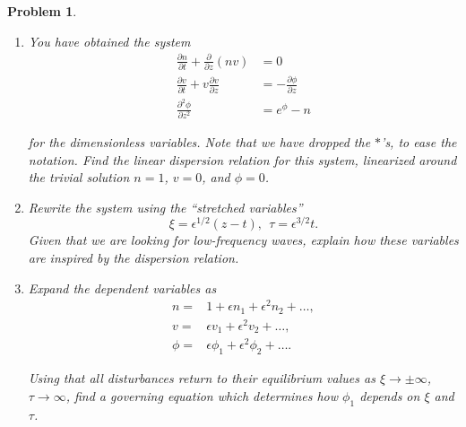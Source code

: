 \documentclass[12pt]{report}
\newtheorem{problem}{Problem}
\def\eps{{\epsilon}}
\newcommand{\pp}[2]{\frac{\partial #1}{\partial #2}} %
\newcommand{\ppn}[3]{\frac{\partial^{#1} #2}{\partial #3^{#1}}} %
\begin{document}
\begin{problem}
\begin{enumerate}
\item[{\bf c}] You have obtained the system
\begin{align*}
    \pp{n}{t}+\pp{}{z}(nv)&=0\\
    \pp{v}{t}+v\pp{v}{z}&= -\pp{\phi}{z}\\
    \ppn{2}{\phi}{z}&= e^\phi-n    
\end{align*}

for the dimensionless variables. Note that we have dropped the $*$'s,
to ease the notation. Find the linear dispersion relation for this
system, linearized around the trivial solution $n=1$, $v=0$, and
$\phi=0$.

\item[{\bf d}] Rewrite the system using the ``stretched variables''
\[
\xi=\eps^{1/2}(z-t), ~~\tau=\eps^{3/2} t.
\]
Given that we are looking for low-frequency waves, explain how these variables are inspired
by the dispersion relation.

\item[{\bf e}] Expand the dependent variables as
\begin{align*}
    n=&1+\epsilon n_1+\epsilon^2 n_2+\ldots, \\
    v=&\epsilon v_1+\epsilon^2 v_2+\ldots, \\
    \phi=&\epsilon \phi_1+\epsilon^2 \phi_2+\ldots .
\end{align*}

Using that all disturbances return to their equilibrium values as $\xi\rightarrow \pm \infty$,
$\tau \rightarrow \infty$, find a governing equation which determines how $\phi_1$ depends on
$\xi$ and $\tau$.

\end{enumerate}
\end{problem}
\end{document}
